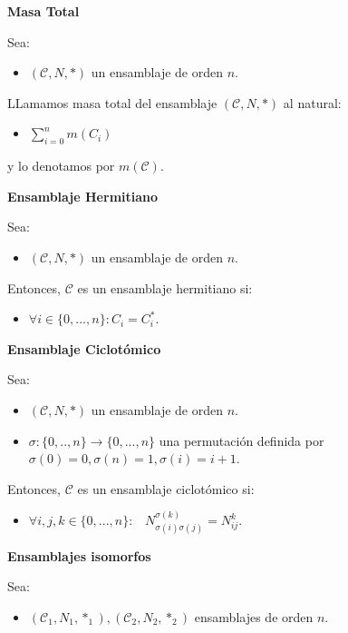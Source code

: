 \documentclass[a5paper]{article}
\renewcommand{\C}{\mathcal{C}}
\begin{document}
{\bf Masa Total}

Sea:
\begin{itemize}

\item $(\C,N,*)$ un ensamblaje de orden $n$.

\end{itemize}

LLamamos masa total del ensamblaje $(\C,N,*)$ al natural:
\begin{itemize}
\item $\displaystyle\sum_{i=0}^n m(C_i)$
\end{itemize}

y lo denotamos por $m(\C)$.

{\bf Ensamblaje Hermitiano}

Sea:
\begin{itemize}

\item $(\C,N,*)$ un ensamblaje de orden $n$.

\end{itemize}

Entonces, $\C$ es un ensamblaje hermitiano si:
\begin{itemize}

\item $\forall i \in \{0,...,n\}: C_i = C_i^*$.

\end{itemize}

{\bf Ensamblaje Ciclotómico}

Sea:
\begin{itemize}

\item $(\C,N,*)$ un ensamblaje de orden $n$.
\item $ \sigma : \{0,..,n\} \longrightarrow \{0,...,n\} $ una permutación definida por $\sigma(0) = 0, \sigma(n) = 1, \sigma(i) = i+1$.

\end{itemize}

Entonces, $\C$ es un ensamblaje ciclotómico si:
\begin{itemize}

\item $\forall i,j,k \in \{0,...,n\}:\hspace{10pt} N_{\sigma(i)\sigma(j)}^{\sigma(k)} = N_{ij}^k$.

\end{itemize}

{\bf Ensamblajes isomorfos }

Sea:
\begin{itemize}

\item $(\C_1,N_1,*_1),(\C_2,N_2,*_2)$ ensamblajes de orden $n$.

\end{itemize}
\end{document}
